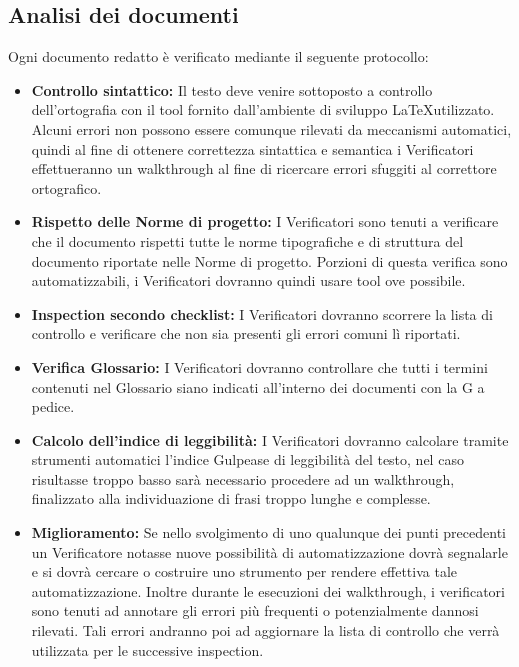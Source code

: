 \documentclass[a4paper]{report}
\begin{document}
			\subsection{Analisi dei documenti}
				Ogni documento redatto è verificato mediante il seguente protocollo:
				\begin{itemize}
					\item \textbf{Controllo sintattico:} Il testo deve venire sottoposto a controllo dell'ortografia con il tool
					fornito dall'ambiente di sviluppo \LaTeX utilizzato. Alcuni errori non possono essere comunque rilevati da
					meccanismi automatici, quindi al fine di ottenere correttezza sintattica e semantica i Verificatori
					effettueranno un walkthrough al fine di ricercare errori sfuggiti al correttore ortografico.
					\item \textbf{Rispetto delle Norme di progetto:} I Verificatori sono tenuti a verificare che il documento
					rispetti tutte le norme tipografiche e di struttura del documento riportate nelle Norme di progetto. Porzioni
					di questa verifica sono automatizzabili, i Verificatori dovranno quindi usare tool ove possibile. 
					\item \textbf{Inspection secondo checklist:} I Verificatori dovranno scorrere la lista di controllo e
					verificare che non sia presenti gli errori comuni lì riportati.
					\item \textbf{Verifica Glossario:} I Verificatori dovranno controllare che tutti i termini contenuti nel 
					Glossario siano indicati all'interno dei documenti con la G a pedice. 
					\item \textbf{Calcolo dell'indice di leggibilità:} I Verificatori dovranno calcolare tramite strumenti
					automatici l'indice Gulpease di leggibilità del testo, nel caso risultasse troppo basso sarà necessario
					procedere ad un walkthrough, finalizzato alla individuazione di frasi troppo lunghe e complesse.
					\item \textbf{Miglioramento:} Se nello svolgimento di uno qualunque dei punti precedenti un Verificatore
					notasse nuove possibilità di automatizzazione dovrà segnalarle e si dovrà cercare o costruire uno strumento per
					rendere effettiva tale automatizzazione. Inoltre durante le esecuzioni dei walkthrough, i verificatori sono
					tenuti ad annotare gli errori più frequenti o potenzialmente dannosi rilevati. Tali errori andranno poi ad
					aggiornare la lista di controllo che verrà utilizzata per le successive inspection.
				\end{itemize}								
			
\end{document}
